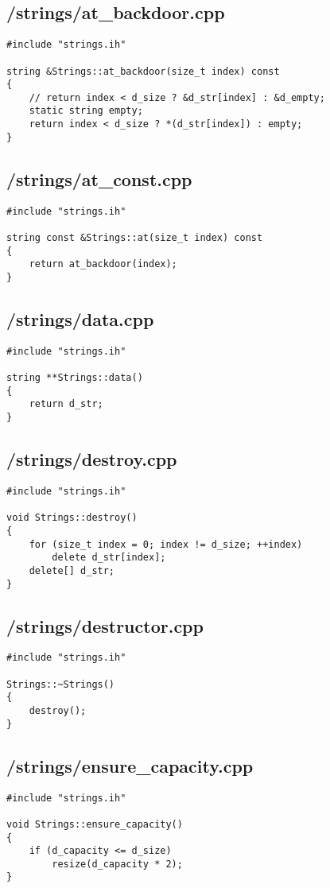 \documentclass{article}
\begin{document}
\subsection*{/strings/at\_backdoor.cpp}
\begin{verbatim}
#include "strings.ih"

string &Strings::at_backdoor(size_t index) const
{
    // return index < d_size ? &d_str[index] : &d_empty;
    static string empty;
    return index < d_size ? *(d_str[index]) : empty; 
}

\end{verbatim}
\subsection*{/strings/at\_const.cpp}
\begin{verbatim}
#include "strings.ih"

string const &Strings::at(size_t index) const
{
    return at_backdoor(index);
}
\end{verbatim}
\subsection*{/strings/data.cpp}
\begin{verbatim}
#include "strings.ih"

string **Strings::data()
{
    return d_str;
}
\end{verbatim}
\subsection*{/strings/destroy.cpp}
\begin{verbatim}
#include "strings.ih"

void Strings::destroy()
{
    for (size_t index = 0; index != d_size; ++index)
        delete d_str[index];
    delete[] d_str;
}
\end{verbatim}
\subsection*{/strings/destructor.cpp}
\begin{verbatim}
#include "strings.ih"

Strings::~Strings()
{
    destroy();
}
\end{verbatim}
\subsection*{/strings/ensure\_capacity.cpp}
\begin{verbatim}
#include "strings.ih"

void Strings::ensure_capacity()
{
    if (d_capacity <= d_size)
        resize(d_capacity * 2);
}
\end{verbatim}
\end{document}
